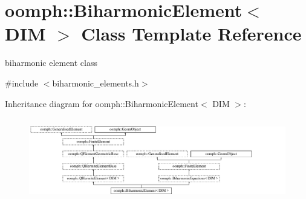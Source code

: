 \hypertarget{classoomph_1_1BiharmonicElement}{}\section{oomph\+:\+:Biharmonic\+Element$<$ D\+IM $>$ Class Template Reference}
\label{classoomph_1_1BiharmonicElement}


biharmonic element class  




{\ttfamily \#include $<$biharmonic\+\_\+elements.\+h$>$}

Inheritance diagram for oomph\+:\+:Biharmonic\+Element$<$ D\+IM $>$\+:\begin{figure}[H]
\begin{center}
\leavevmode
\includegraphics[height=3.700440cm]{classoomph_1_1BiharmonicElement}
\end{center}
\end{figure}
